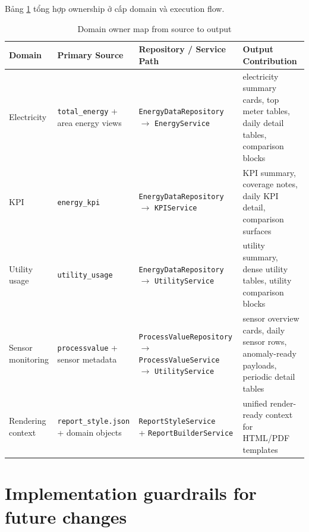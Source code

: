 Bảng \ref{tab:domain_owner_map} tổng hợp ownership ở cấp domain và execution flow.

\begin{table}[htbp]
	\centering
	\renewcommand{\arraystretch}{1.3}
	\caption{Domain owner map from source to output}
	\label{tab:domain_owner_map}
	\begin{tabularx}{\linewidth}{|>{\RaggedRight\arraybackslash}p{2.1cm}|>{\RaggedRight\arraybackslash}p{2.6cm}|>{\RaggedRight\arraybackslash}p{2.8cm}|>{\RaggedRight\arraybackslash}X|}
		\hline
		\textbf{Domain} & \textbf{Primary Source} & \textbf{Repository / Service Path} & \textbf{Output Contribution} \\ \hline
		Electricity & \texttt{total\_energy} + area energy views & \shortstack[l]{\texttt{EnergyDataRepository} \\ $\rightarrow$ \texttt{EnergyService}} & electricity summary cards, top meter tables, daily detail tables, comparison blocks \\ \hline
		KPI & \texttt{energy\_kpi} & \shortstack[l]{\texttt{EnergyDataRepository} \\ $\rightarrow$ \texttt{KPIService}} & KPI summary, coverage notes, daily KPI detail, comparison surfaces \\ \hline
		Utility usage & \texttt{utility\_usage} & \shortstack[l]{\texttt{EnergyDataRepository} \\ $\rightarrow$ \texttt{UtilityService}} & utility summary, dense utility tables, utility comparison blocks \\ \hline
		Sensor monitoring & \texttt{processvalue} + sensor metadata & \shortstack[l]{\texttt{ProcessValueRepository} \\ $\rightarrow$ \texttt{ProcessValueService} \\ $\rightarrow$ \texttt{UtilityService}} & sensor overview cards, daily sensor rows, anomaly-ready payloads, periodic detail tables \\ \hline
		Rendering context & \texttt{report\_style.json} + domain objects & \shortstack[l]{\texttt{ReportStyleService} \\ + \texttt{ReportBuilderService}} & unified render-ready context for HTML/PDF templates \\ \hline
	\end{tabularx}
\end{table}

\section{Implementation guardrails for future changes}

